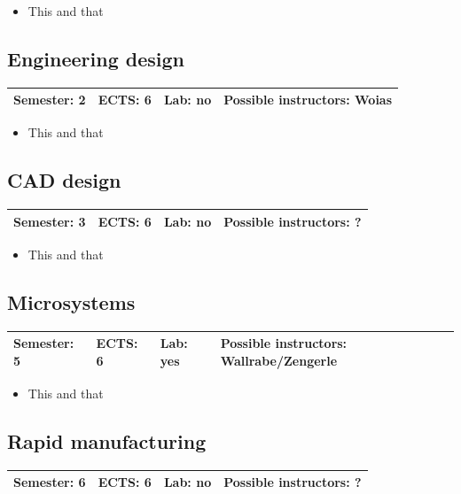 \documentclass[12pt,twoside,fleqn,a4paper]{article}
\begin{document}
\begin{itemize}
\setlength\itemsep{0cm}
\item This and that
\end{itemize}


\subsection{Engineering design}
\begin{tabular}{llll} \hline
\textbf{Semester:} 2 & \textbf{ECTS:} 6 & \textbf{Lab:} no & \textbf{Possible instructors:} Woias\\
\hline
\end{tabular}

\begin{itemize}
\setlength\itemsep{0cm}
\item This and that
\end{itemize}


\subsection{CAD design}
\begin{tabular}{llll} \hline
\textbf{Semester:} 3 & \textbf{ECTS:} 6 & \textbf{Lab:} no & \textbf{Possible instructors:} ?\\
\hline
\end{tabular}

\begin{itemize}
\setlength\itemsep{0cm}
\item This and that
\end{itemize}


\subsection{Microsystems}
\begin{tabular}{llll} \hline
\textbf{Semester:} 5 & \textbf{ECTS:} 6 & \textbf{Lab:} yes & \textbf{Possible instructors:} Wallrabe/Zengerle\\
\hline
\end{tabular}

\begin{itemize}
\setlength\itemsep{0cm}
\item This and that
\end{itemize}


\subsection{Rapid manufacturing}
\begin{tabular}{llll} \hline
\textbf{Semester:} 6 & \textbf{ECTS:} 6 & \textbf{Lab:} no & \textbf{Possible instructors:} ?\\
\hline
\end{tabular}
\end{document}
